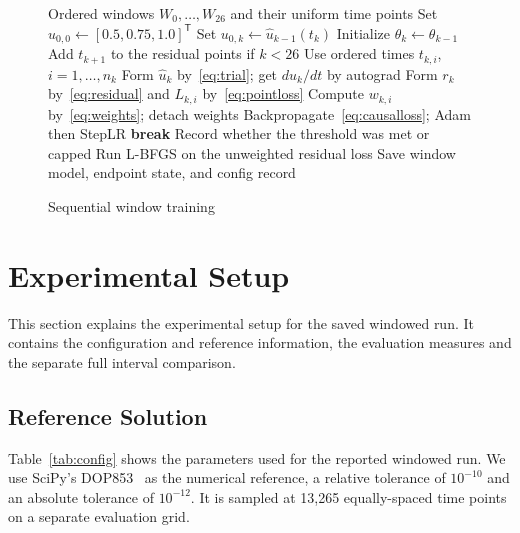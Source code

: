 \documentclass[conference,a4paper]{IEEEtran}
\begin{document}
\begin{figure}[t]
\centering
\begin{minipage}{\columnwidth}
\begin{algorithmic}[1]
\Require Ordered windows $W_0,\ldots,W_{26}$ and their uniform time points
\State Set $u_{0,0}\gets[0.5,0.75,1.0]^\mathsf{T}$
    \State Set $u_{0,k}\gets\hat{u}_{k-1}(t_k)$
    \State Initialize $\theta_k\gets\theta_{k-1}$
  \EndIf
  \State Add $t_{k+1}$ to the residual points if $k<26$
      \State Use ordered times $t_{k,i}$, $i=1,\ldots,n_k$
    \State Form $\hat{u}_k$ by~\eqref{eq:trial}; get $d\hat{u}_k/dt$ by autograd
    \State Form $r_k$ by~\eqref{eq:residual} and $L_{k,i}$ by~\eqref{eq:pointloss}
    \State Compute $w_{k,i}$ by~\eqref{eq:weights}; detach weights
      \State Backpropagate~\eqref{eq:causalloss}; Adam then StepLR
        \State \textbf{break}
      \EndIf
    \EndFor
    \State Record whether the threshold was met or capped
  \EndFor
  \State Run L-BFGS on the unweighted residual loss
  \State Save window model, endpoint state, and config record
\EndFor
\end{algorithmic}
\end{minipage}
\caption{Sequential window training}
\label{fig:training}
\end{figure}



\section{Experimental Setup}

This section explains the experimental setup for the saved windowed run. It contains the configuration and reference information, the evaluation measures and the separate full interval comparison.

\subsection{Reference Solution}


Table~\ref{tab:config} shows the parameters used for the reported windowed run. We use SciPy’s DOP853~\cite{virtanen2020} as the numerical reference, a relative tolerance of $10^{-10}$ and an absolute tolerance of $10^{-12}$. It is sampled at 13,265 equally-spaced time points on a separate evaluation grid.
\end{document}
